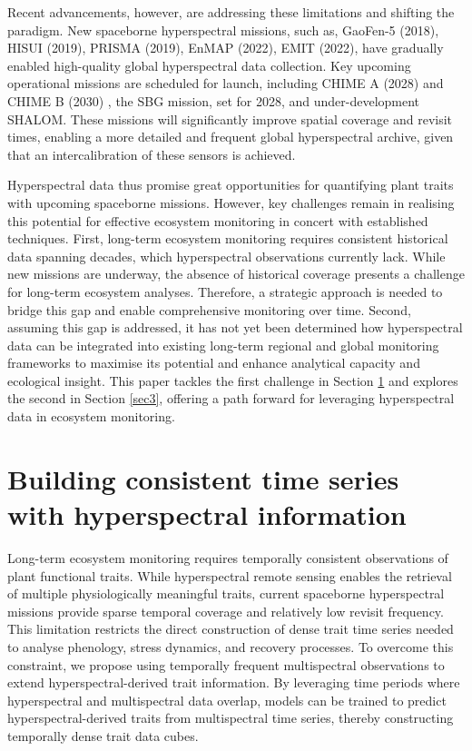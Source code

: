 \documentclass[pdflatex,sn-mathphys-num]{sn-jnl}%
\theoremstyle{thmstyleone}%
\theoremstyle{thmstyletwo}%
\theoremstyle{thmstylethree}%
\begin{document}
Recent advancements, however, are addressing these limitations and shifting the paradigm. New spaceborne hyperspectral missions, such as\cite{alonso2019data}, GaoFen-5 (2018)\cite{liu2019advanced}, HISUI (2019)\cite{iwasaki2011hyperspectral}, PRISMA (2019)\cite{loizzo2019prisma}, EnMAP (2022)\cite{guanter2015enmap}, EMIT (2022), have gradually enabled high-quality global hyperspectral data collection. Key upcoming operational missions are scheduled for launch, including CHIME A (2028) and CHIME B (2030) \cite{nieke2018towards}, the SBG mission\cite{cawse2021nasa}, set for 2028, and under-development SHALOM\cite{feingersh2015shalom}. These missions will significantly improve spatial coverage and revisit times, enabling a more detailed and frequent global hyperspectral archive, given that an intercalibration of these sensors is achieved. %
 

Hyperspectral data thus promise great opportunities for quantifying plant traits with upcoming spaceborne missions. However, key challenges remain in realising this potential for effective ecosystem monitoring in concert with established techniques.
First, long-term ecosystem monitoring requires consistent historical data spanning decades, which hyperspectral observations currently lack. While new missions are underway, the absence of historical coverage presents a challenge for long-term ecosystem analyses. Therefore, a strategic approach is needed to bridge this gap and enable comprehensive monitoring over time.
Second, assuming this gap is addressed, it has not yet been determined how hyperspectral data can be integrated into existing long-term regional and global monitoring frameworks to maximise its potential and enhance analytical capacity and ecological insight.
This paper tackles the first challenge in Section \ref{sec2} and explores the second in Section \ref{sec3}, offering a path forward for leveraging hyperspectral data in ecosystem monitoring.


\section{Building consistent time series with hyperspectral information} \label{sec2}

Long-term ecosystem monitoring requires temporally consistent observations of plant functional traits. While hyperspectral remote sensing enables the retrieval of multiple physiologically meaningful traits, current spaceborne hyperspectral missions provide sparse temporal coverage and relatively low revisit frequency. This limitation restricts the direct construction of dense trait time series needed to analyse phenology, stress dynamics, and recovery processes. To overcome this constraint, we propose using temporally frequent multispectral observations to extend hyperspectral-derived trait information. By leveraging time periods where hyperspectral and multispectral data overlap, models can be trained to predict hyperspectral-derived traits from multispectral time series, thereby constructing temporally dense trait data cubes.
\end{document}
